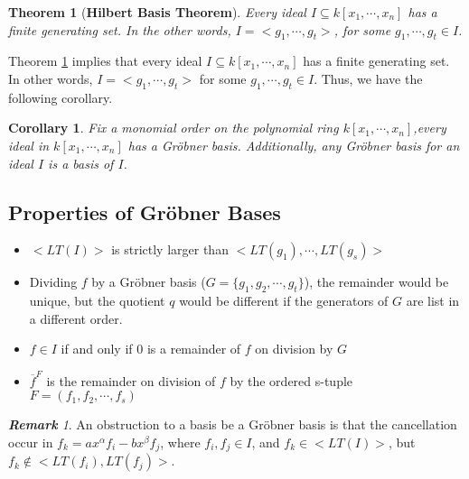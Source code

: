 \documentclass{article}
\newtheorem{theorem}{Theorem}[section]
\newtheorem{corollary}{Corollary}[theorem]
\theoremstyle{definition}
\theoremstyle{remark}
\newtheorem*{remark}{\textbf{Remark}}
\theoremstyle{example}
\begin{document}
\begin{theorem}[\textbf{Hilbert Basis Theorem}]\cite{cox_grobner_2015}\label{thm:hb_thm}
    Every ideal $I \subseteq k[x_1,\cdots,x_n]$ has a finite generating set. In the other words, $I = <g_1,\cdots,g_t>$, for some $g_1,\cdots,g_t \in I$.
\end{theorem}

Theorem \ref{thm:hb_thm} implies that every ideal $I \subseteq k[x_1, \cdots, x_n]$ has a finite generating set. In other words, $I = <g_1, \cdots, g_t>$ for some $g_1, \cdots, g_t \in I$. Thus, we have the following corollary.

\begin{corollary}\cite{cox_grobner_2015}\label{cor:gbI}
    Fix a monomial order on the polynomial ring $k[x_1,\cdots,x_n]$,every ideal in $k[x_1, \cdots, x_n]$ has a Gröbner basis. Additionally, any Gröbner basis for an ideal $I$ is a basis of $I$.
\end{corollary}

\subsection{Properties of Gröbner Bases}
\begin{itemize}
    \item $<LT(I)>$ is strictly larger than $<LT(g_1), \cdots, LT(g_s)>$
    \item Dividing $f$ by a Gröbner basis ($G = \{g_1, g_2, \cdots, g_t\}$), the remainder would be unique, but the quotient $q$ would be different if the generators of $G$ are list in a different order.
    \item $f \in I$ if and only if $0$ is a remainder of $f$ on division by $G$
    \item $\overline{f}^{F}$ is the remainder on division of $f$ by the ordered s-tuple $F = (f_1, f_2, \cdots, f_s)$
\end{itemize}

\begin{remark}
    An obstruction to a basis be a Gröbner basis is that the cancellation occur in $f_k = ax^{\alpha}f_i - bx^{\beta}f_{j}$, where $f_i,f_j \in I$, and $f_k \in <LT(I)>$, but $f_k \notin <LT(f_i), LT(f_j)>$.
\end{remark}
\end{document}
